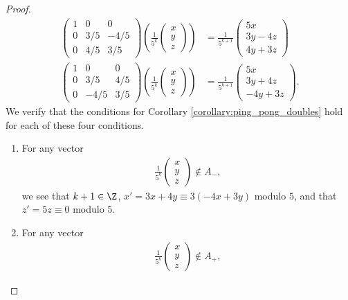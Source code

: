 \begin{proof}
\begin{align*}
    \begin{pmatrix}1 & 0 & 0 \\ 0 & 3/5 & -4/5 \\ 0 & 4/5 & 3/5\end{pmatrix}\left(\frac{1}{5^{k}} \begin{pmatrix}x\\y\\z\end{pmatrix}\right) &= \frac{1}{5^{k+1}} \begin{pmatrix}5x \\ 3y- 4z \\ 4y + 3z\end{pmatrix}\tag*{(3)}\\
    \begin{pmatrix}1 & 0 & 0 \\ 0 & 3/5 & 4/5 \\ 0 & -4/5 & 3/5\end{pmatrix} \left(\frac{1}{5^{k}} \begin{pmatrix}x\\y\\z\end{pmatrix}\right) &= \frac{1}{5^{k+1}} \begin{pmatrix}5x \\ 3y + 4z \\ -4y + 3z\end{pmatrix}.\tag*{(4)}
  \end{align*}
  We verify that the conditions for Corollary \ref{corollary:ping_pong_doubles} hold for each of these four conditions.
  \begin{enumerate}[(1)]
    \item For any vector
      \begin{align*}
        \frac{1}{5^{k}} \begin{pmatrix}x\\y\\z\end{pmatrix} \notin A_{-},
      \end{align*}
      we see that $k+1\in \Z$, $x' = 3x + 4y \equiv 3\left(-4x + 3y\right)$  modulo $5$, and that $z' = 5z\equiv 0$ modulo $5$.
    \item For any vector
      \begin{align*}
        \frac{1}{5^{k}} \begin{pmatrix}x\\y\\z\end{pmatrix} \notin A_{+},

\end{align*}
\end{enumerate}
\end{proof}
